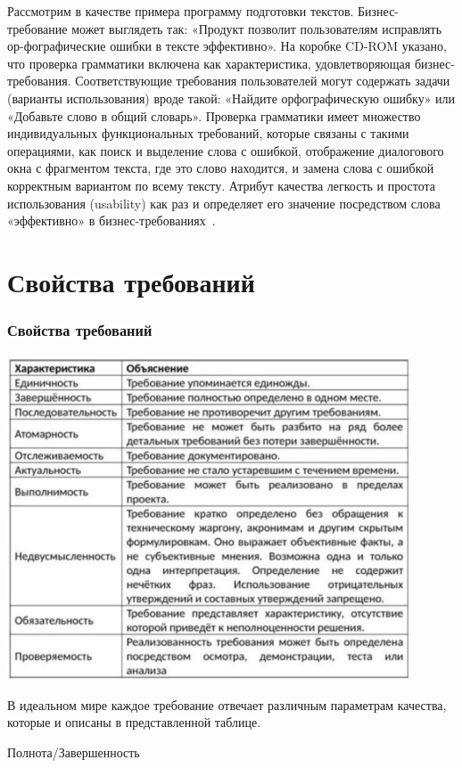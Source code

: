 \documentclass{../industrial-development}
\begin{document}
\lecturenotes

Рассмотрим в качестве примера программу подготовки текстов. Бизнес-требование может выглядеть так: «Продукт позволит пользователям исправлять ор-фографические ошибки в тексте эффективно». На коробке CD-ROM указано, что проверка грамматики включена как характеристика, удовлетворяющая бизнес-требования. Соответствующие требования пользователей могут содержать задачи (варианты использования) вроде такой: «Найдите орфографическую ошибку» или «Добавьте слово в общий словарь». Проверка грамматики имеет множество индивидуальных функциональных требований, которые связаны с такими операциями, как поиск и выделение слова с ошибкой, отображение диалогового окна с фрагментом текста, где это слово находится, и замена слова с ошибкой корректным вариантом по всему тексту. Атрибут качества легкость и простота использования (usability) как раз и определяет его значение посредством слова «эффективно» в бизнес-требованиях~\cite[с.~10--11]{Wiegers}.


\section{Свойства требований}
\begin{frame} \frametitle{Свойства требований}
  \centerline{\includegraphics[width=0.9\textwidth]{pict2.pdf}}
\end{frame}

\lecturenotes

В идеальном мире каждое требование отвечает различным параметрам качества, которые и описаны в представленной таблице.

\alert{Полнота/Завершенность}
\end{document}

